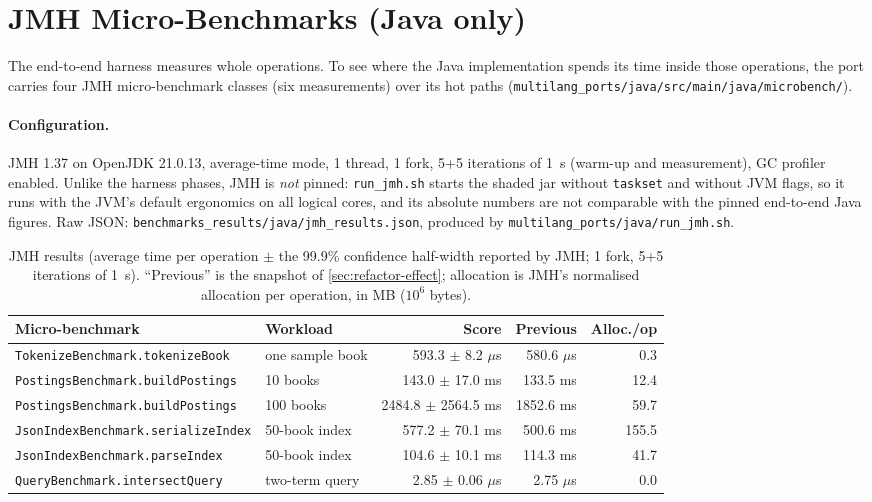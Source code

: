 \section{JMH Micro-Benchmarks (Java only)}
\label{sec:jmh}

The end-to-end harness measures whole operations. To see where the Java
implementation spends its time inside those operations, the port carries
four JMH micro-benchmark classes (six measurements) over its hot paths
(\texttt{multilang\_ports/java/src/main/java/microbench/}).

\paragraph{Configuration.}
JMH 1.37 on OpenJDK 21.0.13, average-time mode, 1 thread, 1 fork, 5+5
iterations of 1~s (warm-up and measurement), GC profiler enabled. Unlike the
harness phases, JMH is \emph{not} pinned: \texttt{run\_jmh.sh} starts the
shaded jar without \texttt{taskset} and without JVM flags, so it runs with
the JVM's default ergonomics on all logical cores, and its absolute numbers
are not comparable with the pinned end-to-end Java figures. Raw JSON:
\texttt{benchmarks\_\allowbreak results/java/\allowbreak jmh\_\allowbreak results.json},
produced by \texttt{multilang\_\allowbreak ports/java/\allowbreak run\_\allowbreak jmh.sh}.

\begin{table}[htbp]
    \centering
    \footnotesize
    \caption{JMH results (average time per operation $\pm$ the 99.9\%
    confidence half-width reported by JMH; 1 fork, 5+5 iterations of 1~s).
    ``Previous'' is the snapshot of \cref{sec:refactor-effect}; allocation
    is JMH's normalised allocation per operation, in MB ($10^6$ bytes).}
    \label{tab:jmh}
    \begin{tabular}{@{}llrrr@{}}
        \toprule
        Micro-benchmark & Workload & Score & Previous & Alloc./op \\
        \midrule
        \texttt{TokenizeBenchmark.tokenizeBook} & one sample book & 593.3 $\pm$ 8.2 $\mu$s & 580.6 $\mu$s & 0.3 \\
        \texttt{PostingsBenchmark.buildPostings} & 10 books & 143.0 $\pm$ 17.0 ms & 133.5 ms & 12.4 \\
        \texttt{PostingsBenchmark.buildPostings} & 100 books & 2484.8 $\pm$ 2564.5 ms & 1852.6 ms & 59.7 \\
        \texttt{JsonIndexBenchmark.serializeIndex} & 50-book index & 577.2 $\pm$ 70.1 ms & 500.6 ms & 155.5 \\
        \texttt{JsonIndexBenchmark.parseIndex} & 50-book index & 104.6 $\pm$ 10.1 ms & 114.3 ms & 41.7 \\
        \texttt{QueryBenchmark.intersectQuery} & two-term query & 2.85 $\pm$ 0.06 $\mu$s & 2.75 $\mu$s & 0.0 \\
        \bottomrule
    \end{tabular}
\end{table}

